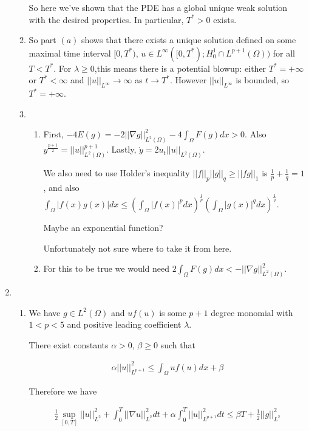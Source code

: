 \documentclass[12pt, letterpaper]{article}
\begin{document}
\begin{enumerate}
\begin{enumerate}
So here we've shown that the PDE has a global unique weak solution with the desired properties. In particular, $T^* >0$ exists.

\item So part $(a)$ shows that there exists a unique solution defined on some maximal time interval $[0,T^*)$, $u\in L^\infty([0,T^*);H_0^1\cap L^{p+1}(\Omega))$ for all $T<T^*$. For $\lambda\ge0$,this means there is a potential blowup: either $T^*=+\infty$ or $T^*<\infty$ and $||u||_{L^\infty}\rightarrow\infty$ as $t\rightarrow T^*$. However $||u||_{L^\infty}$ is bounded, so $T^*=+\infty$.

\item \begin{enumerate}
\item First, $-4E(g)=-2||\nabla g||^2_{L^2(\Omega)}-4\int_\Omega F(g)dx > 0$. Also $y^{\frac{p+1}{2}}=||u||^{p+1}_{L^2(\Omega)}$. Lastly, $\dot y=2u_t||u||_{L^2(\Omega)}$.

We also need to use Holder's inequality $||f||_p||g||_q\ge||fg||_1$ is $\frac{1}{p}+\frac{1}{q}=1$, and also $\int_\Omega |f(x)g(x)|dx\le (\int_\Omega|f(x)|^pdx)^{\frac{1}{p}}(\int_\Omega|g(x)|^qdx)^{\frac{1}{q}}$.

Maybe an exponential function?

Unfortunately not sure where to take it from here.

\item For this to be true we would need $2\int_\Omega F(g)dx < -||\nabla g||^2_{L^2(\Omega)}$.

\end{enumerate}

\end{enumerate}


\item \begin{enumerate}
\item We have $g\in L^2(\Omega)$ and $uf(u)$ is some $p+1$ degree monomial with $1<p<5$ and positive leading coefficient $\lambda$.

There exist constants $\alpha>0$, $\beta\ge0$ such that

\begin{align}
\alpha||u||^2_{L^{p+1}}\le\int_\Omega uf(u)dx + \beta
\end{align}

Therefore we have

\begin{align}
\frac{1}{2}\sup_{[0,T]}||u||^2_{L^{2}} + \int_0^T||\nabla u||^2_{L^{2}}dt +\alpha\int_0^T||u||_{L^{p+1}}^2dt \le\beta T+\frac{1}{2}||g||^2_{L^2}
\end{align}


\end{enumerate}
\end{enumerate}
\end{document}
